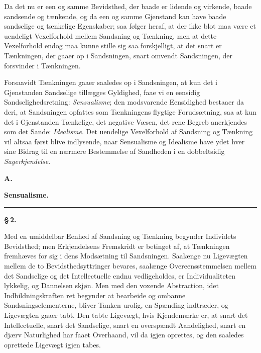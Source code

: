 \documentclass[12pt]{book}
\newcommand{\opage}[1]{\marginnote{\footnotesize\textit{[#1]}}}
\begin{document}
Da det nu er een og samme Bevidsthed, der baade er lidende og virkende, baade
sandsende og tænkende, og da een og samme Gjenstand kan have baade sandselige og
\opage{7} tænkelige Egenskaber; saa følger heraf, at der ikke blot maa være et uendeligt
Vexelforhold mellem Sandsning og Tænkning, men at dette Vexelforhold endog maa
kunne stille sig saa forskjelligt, at det snart er Tænkningen, der gaaer op i
Sandsningen, snart omvendt Sandsningen, der forsvinder i Tænkningen.

Forsaavidt Tænkningen gaaer saaledes op i Sandsningen, at kun det i Gjenstanden
Sandselige tillægges Gyldighed, faae vi en eensidig Sandselighedsretning:
\emph{Sensualisme}; den modsvarende Eensidighed bestaaer da deri, at Sandsningen
opfattes som Tænkningens flygtige Forudsætning, saa at kun det i Gjenstanden
Tænkelige, det negative Væsen, det rene Begreb anerkjendes som det Sande:
\emph{Idealisme}. Det uendelige Vexelforhold af Sandsning og Tænkning vil altsaa
først blive indlysende, naar Sensualisme og Idealisme have ydet hver sine Bidrag
til en nærmere Bestemmelse af Sandheden i en dobbeltsidig \emph{Sagerkjendelse}.

\begin{center}
  {\large\bfseries A.}\par\vspace{2pt}
  {\bfseries Sensualisme.}\par\vspace{4pt}
  \rule{2cm}{0.4pt}
\end{center}
{}

\begin{center}{\bfseries \S\,2.}\end{center}

\noindent Med en umiddelbar Eenhed af Sandsning og Tænkning begynder Individets
Bevidsthed; men Erkjendelsens Fremskridt er betinget af, at Tænkningen fremhæves
for sig i dens Modsætning til Sandsningen. Saalænge nu Ligevægten mellem de to
Bevidsthedsyttringer bevares, saalænge Overeensstemmelsen mellem det Sandselige og
det Intellectuelle endnu vedligeholdes, er Individualiteten lykkelig, og Dannelsen
skjøn. Men med den voxende Abstraction, idet Indbildningskraften ret begynder at
bearbeide og ombanne
\opage{8} Sandsningselementerne, bliver Tanken urolig, en Spænding indtræder, og Ligevægten
gaaer tabt. Den tabte Ligevægt, hvis Kjendemærke er, at snart det Intellectuelle,
snart det Sandselige, snart en overspændt Aandelighed, snart en djærv Naturlighed
har faaet Overhaand, vil da igjen oprettes, og den saaledes oprettede Ligevægt
igjen tabes.
\end{document}

